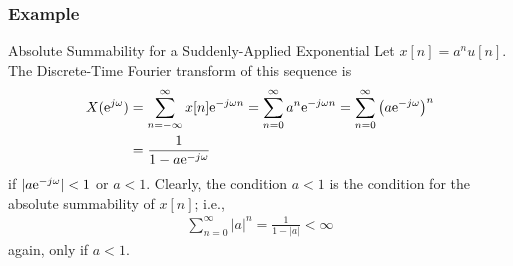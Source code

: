 \documentclass[mathserif,9pt,handout]{beamer}
\begin{document}
\begin{frame}\frametitle{Example}\small
   
   \begin{alertblock}{Absolute Summability for a Suddenly-Applied Exponential}
   Let $x[n] = a^n u[n]$. The Discrete-Time Fourier transform of this sequence is  
   \begin{align}
     X({\textrm{e}}^{j\omega}) &= \sum_{n=-\infty}^{\infty} x[n] {\textrm{e}}^{-j\omega n}
     = \sum_{n=0}^{\infty} a^n {\textrm{e}}^{-j\omega n}
     = \sum_{n=0}^{\infty} \left(a {\textrm{e}}^{-j\omega}\right)^n
     \nonumber \\
     &= \frac{1}{1 - a {\textrm{e}}^{-j\omega}} \nonumber
   \end{align}
   if $|a {\textrm{e}}^{-j\omega}| < 1$ or $a < 1$. Clearly, the condition $a<1$ is the condition for the absolute summability of $x[n]$; i.e.,
   \begin{align}
      \sum_{n=0}^{\infty} |a|^n = \frac{1}{1-|a|} < \infty
     \nonumber
   \end{align} 
   again, only if $a < 1$. 
   \end{alertblock}
   
\end{frame}
\end{document}
